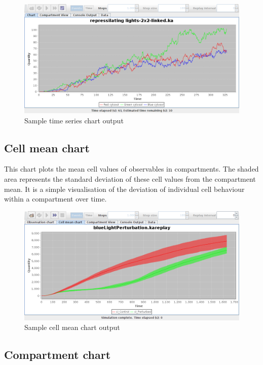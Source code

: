 \begin{figure}[h!]
 \centering
 \includegraphics[scale=0.3]{./images/ChartPane.png}
 \caption{Sample time series chart output}
 \label{fig:chartPane}
\end{figure}

\subsection{Cell mean chart}

This chart plots the mean cell values of observables in compartments. The shaded area represents the standard deviation of these cell values from the compartment mean. It is a simple visualisation of the deviation of individual cell behaviour within a compartment over time.

\begin{figure}[h!]
 \centering
 \includegraphics[scale=0.3]{./images/CellMeanChartPane.png}
 \caption{Sample cell mean chart output}
 \label{fig:cellMeanChartPane}
\end{figure}

\subsection{Compartment chart}

